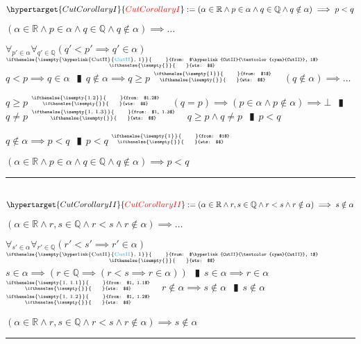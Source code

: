 \documentclass{book}
\newcommand{\df}[1]{\hypertarget{#1}{\textcolor{red}{#1}}}
\newcommand{\rf}[1]{\hyperlink{#1}{\textcolor{cyan}{#1}}}
\newcommand{\abr}{:=}
\newcommand{\pipe}{$\phantom{(}\vrectangleblack\phantom{)}$}
\newcommand{\pr}[1]{\left(#1\right)}
\newcommand{\ann}[2]{%
  \hfill %
  $\stackrel%
  {\hbox{\tiny{\ifthenelse{\isempty{#1}}%
    {\phantom{from}}%
    {from: $#1$}}}}%
  {\hbox{\tiny{\ifthenelse{\isempty{#2}}%
    {\phantom{wts}}%
    {wts: $#2$}}}}$%
\ }
\begin{document}
$\df{CutCorollaryI} \abr (\alpha \in \mathbb{R} \land p \in \alpha \land q \in \mathbb{Q} \land q \notin \alpha) \implies p < q$
\begin{enumerate}
  \lit $(\alpha \in \mathbb{R} \land p \in \alpha \land q \in \mathbb{Q} \land q \notin \alpha) \implies \ldots$
  \begin{enumerate}
    \lit $\forall_{p' \in \alpha} \forall_{q' \in \mathbb{Q}}(q' < p' \implies q' \in \alpha)$    \ann{\rf{CutII}, 1}{}
    \lit $q < p \implies q \in \alpha$ \pipe $q \notin \alpha \implies q \geq p$    \ann{1}{}
    \lit $(q \notin \alpha) \implies \ldots$
    \begin{enumerate}
      \lit $q \geq p$    \ann{1.2}{}
      \lit $(q = p) \implies (p \in \alpha \land p \notin \alpha) \implies \bot$ \pipe $q \neq p$    \ann{1, 1.3}{}
      \lit $q \geq p \land q \neq p$ \pipe $p < q$
    \end{enumerate}
    \lit $q \notin \alpha \implies p < q$ \pipe $p < q$    \ann{1}{}
  \end{enumerate}
  \lit $(\alpha \in \mathbb{R} \land p \in \alpha \land q \in \mathbb{Q} \land q \notin \alpha) \implies p < q$
\end{enumerate} \vspace{.75mm} \hrule \vspace{.75mm} \ \\

$\df{CutCorollaryII} \abr (\alpha \in \mathbb{R} \land r, s \in \mathbb{Q} \land r < s \land r \notin \alpha) \implies s \notin \alpha$
\begin{enumerate}
  \lit $(\alpha \in \mathbb{R} \land r, s \in \mathbb{Q} \land r < s \land r \notin \alpha) \implies \ldots$
  \begin{enumerate}
    \lit $\forall_{s' \in \alpha} \forall_{r' \in \mathbb{Q}}(r' < s' \implies r' \in \alpha)$    \ann{\rf{CutII}, 1}{}
    \lit $s \in \alpha \implies \pr{r \in \mathbb{Q} \implies (r < s \implies r \in \alpha)}$ \pipe $s \in \alpha \implies r \in \alpha$    \ann{1, 1.1}{}
    \lit $r \notin \alpha \implies s \notin \alpha$ \pipe $s \notin \alpha$    \ann{1, 1.2}{}
  \end{enumerate}
  \lit $(\alpha \in \mathbb{R} \land r, s \in \mathbb{Q} \land r < s \land r \notin \alpha) \implies s \notin \alpha$
\end{enumerate} \vspace{.75mm} \hrule \vspace{.75mm} \ \\
\end{document}
